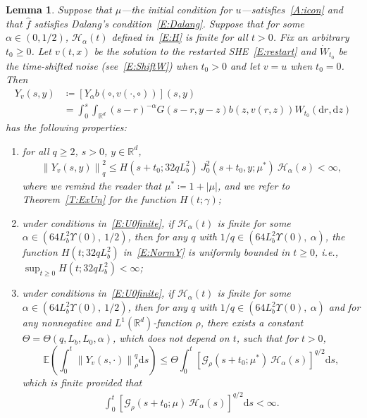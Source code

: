 \documentclass[sn-mathphys]{sn-jnl}%
\newcommand{\BR}{\mathbb{R}}
\newcommand{\E}{\mathbb{E}}
\newcommand{\Norm}[1]{\left\| #1 \right\|}
\newcommand{\ud}{\ensuremath{\mathrm{d}}}
\numberwithin{equation}{section}
\theoremstyle{thmstyleone}%
\newtheorem{lemma}[theorem]{Lemma}
\theoremstyle{thmstyletwo}%
\theoremstyle{thmstylethree}%
\begin{document}
\begin{lemma}\label{L:yineq}
  Suppose that $\mu$---the initial condition for $u$---satisfies~\eqref{A:icon} and that
  $\widehat{f}$ satisfies Dalang's condition~\eqref{E:Dalang}. Suppose that for some $\alpha\in
  (0,1/2)$, $\mathcal{H}_\alpha(t)$ defined in~\eqref{E:H} is finite for all $t>0$. Fix an arbitrary
  $t_0\ge 0$. Let $v(t,x)$ be the solution to the restarted SHE~\eqref{E:restart} and
  $\dot{W}_{t_0}$ be the time-shifted noise (see~\eqref{E:ShiftW}) when $t_0>0$ and let $v = u$ when
  $t_0 = 0$. Then
  \begin{equation}\label{E:Y}
    \begin{aligned}
      Y_v(s,y) & \coloneqq \left[Y_\alpha b\left(\circ, v(\cdot,\circ)\right)\right](s,y) \\
               & = \int_0^s \int_{\BR^d} (s-r)^{-\alpha}G(s-r,y-z)b(z,v(r,z))W_{t_0}(\ud r,\ud z)
    \end{aligned}
  \end{equation}
  has the following properties:
  \begin{enumerate}[(1)]
    \item for all $q\ge 2$, $s>0$, $y\in\BR^d$,
      \begin{align}\label{E:NormY}
        \Norm{Y_v(s,y)}_q^2 \le H\left(s+t_0;32qL_b^2\right) \: J_0^2 (s + t_0,y;\mu^*)\: \mathcal{H}_\alpha(s)<\infty,
      \end{align}
      where we remind the reader that $\mu^* \coloneqq 1 + \lvert\mu\rvert$, and we refer to
      Theorem~\ref{T:ExUn} for the function $H\left(t;\gamma\right)$;
    \item under conditions in~\eqref{E:U0finite}, if $\mathcal{H}_\alpha(t)$ is finite for some
      $\alpha\in \left(64 L_b^2 \Upsilon(0),\: 1/2\right)$, then for any $q$ with $1/q\in \left(64
      L_b^2 \Upsilon(0), \: \alpha\right)$, the function $H\left(t;32qL_b^2\right)$
      in~\eqref{E:NormY} is uniformly bounded in $t\ge 0$, i.e., $\sup_{t\ge
      0}H\left(t;32qL_b^2\right)<\infty$;
    \item under conditions in~\eqref{E:U0finite}, if $\mathcal{H}_\alpha(t)$ is finite for some
      $\alpha\in \left(64 L_b^2 \Upsilon(0),\: 1/2\right)$, then for any $q$ with $1/q\in \left(64
      L_b^2 \Upsilon(0), \: \alpha\right)$ and for any nonnegative and $L^1 (\BR^d)$-function $\rho$,
      there exists a constant $\Theta = \Theta\left(q,L_b,L_0,\alpha\right)$, which does not depend
      on $t$, such that for $t>0$,
      \begin{equation}\label{E:yineq}
        \E \left(\int_0^{t} \Norm{Y_v(s,\cdot)}_{\rho}^q \ud s\right)
        \le \Theta \int_0^t \left[\mathcal{G}_{\rho}(s + t_0;\mu^*)\: \mathcal{H}_\alpha(s)\right]^{q/2} \ud s,
      \end{equation}
      which is finite provided that
    \begin{align}\label{E:GH-int'}
      \int_{0}^t \left[\mathcal{G}_{\rho}(s + t_0;\mu)\:\mathcal{H}_\alpha(s)\right]^{q/2} \ud s <\infty.
    \end{align}
  \end{enumerate}
\end{lemma}
\end{document}
